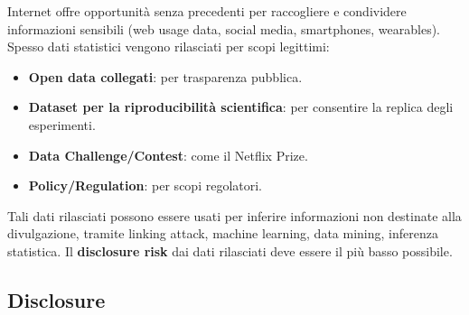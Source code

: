 \documentclass[a4paper,11pt]{article}
\begin{document}
Internet offre opportunit\`{a} senza precedenti per raccogliere e condividere informazioni sensibili (web usage data, social media, smartphones, wearables). Spesso dati statistici vengono rilasciati per scopi legittimi:
\begin{itemize}
  \item \textbf{Open data collegati}: per trasparenza pubblica.
  \item \textbf{Dataset per la riproducibilit\`{a} scientifica}: per consentire la replica degli esperimenti.
  \item \textbf{Data Challenge/Contest}: come il Netflix Prize.
  \item \textbf{Policy/Regulation}: per scopi regolatori.
\end{itemize}
Tali dati rilasciati possono essere usati per inferire informazioni non destinate alla divulgazione, tramite linking attack, machine learning, data mining, inferenza statistica. Il \textbf{disclosure risk} dai dati rilasciati deve essere il pi\`{u} basso possibile.

\subsection{Disclosure}
\end{document}
